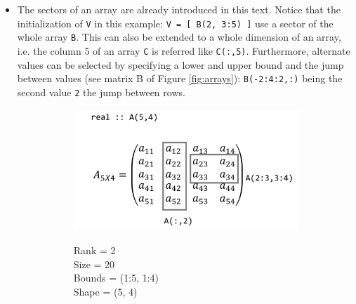 \begin{itemize}
    \item The sectors of an array are already introduced in this text. Notice that the initialization of \texttt{V} in this example: \texttt{V = [ B(2, 3:5) ]} use a sector of the whole array \texttt{B}. This can also be extended to a whole dimension of an array, i.e. the column 5 of an array \texttt{C} is referred like \texttt{C(:,5)}. Furthermore, alternate values can be selected by specifying a lower and upper bound and the jump between values (see matrix B of Figure \ref{fig:arrays}): \texttt{B(-2:4:2,:)} being the second value \texttt{2} the jump between rows.
    
    \begin{figure}
        \begin{subfigure}[h]{0.5\textwidth}

            \centering
            \includegraphics[width = \textwidth]{./doc/Figures/Array1.png}  \\
            \begin{flushleft}
                Rank = 2 \\
                Size = 20 \\
                Bounds = (1:5, 1:4) \\
                Shape = (5, 4)
            \end{flushleft}

        \end{subfigure}
        \hspace{\fill}
        \begin{subfigure}[h]{0.5\textwidth}


\end{subfigure}
\end{figure}
\end{itemize}
